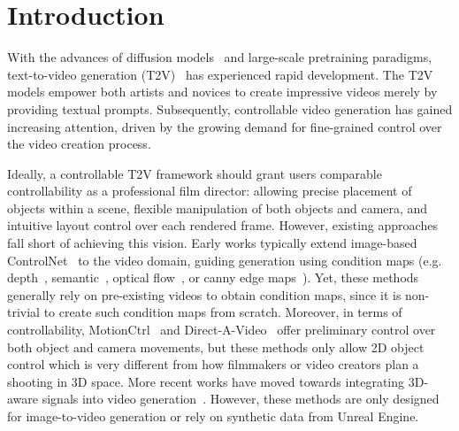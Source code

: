 \section{Introduction}
\label{sec:intro}
With the advances of diffusion models~\cite{ddpm,ddim,sd} and large-scale pretraining paradigms, text-to-video generation (T2V)~\cite{VideoComposer,chen2023videocrafter1,svd,animatediff} has experienced rapid development. The T2V models empower both artists and novices to create impressive videos merely by providing textual prompts. Subsequently, controllable video generation has gained increasing attention, driven by the growing demand for fine-grained control over the video creation process.


Ideally, a controllable T2V framework should grant users comparable controllability as a professional film director: allowing precise placement of objects within a scene, flexible manipulation of both objects and camera, and intuitive layout control over each rendered frame.
However, existing approaches fall short of achieving this vision.
Early works typically extend image-based ControlNet~\cite{controlnet,mou2024t2i} to the video domain, guiding generation using condition maps (e.g. depth~\cite{chen2023control}, semantic~\cite{wang2024easycontrol}, optical flow~\cite{motioni2v,koroglu2024onlyflow,bian2025gs}, or canny edge maps~\cite{wang2024easycontrol,guo2023sparsectrl}). Yet, these methods generally rely on pre-existing videos to obtain condition maps, since it is non-trivial to create such condition maps from scratch. Moreover, in terms of controllability, MotionCtrl~\cite{MotionCtrl} and Direct-A-Video~\cite{yang2024direct} offer preliminary control over both object and camera movements, but these methods only allow 2D object control which is very different from how filmmakers or video creators plan a shooting in 3D space. More recent works have moved towards integrating 3D-aware signals into video generation~\cite{fu20243dtrajmaster,chen2025perception,shader,shuai2025free}. However, these methods are only designed for image-to-video generation or rely on synthetic data from Unreal Engine.




